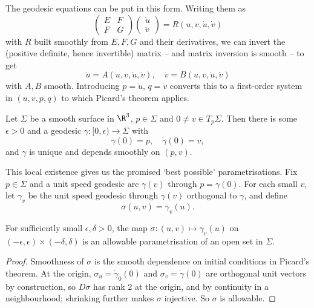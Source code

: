 The geodesic equations can be put in this form. Writing them as
$$
\begin{pmatrix} E & F \\ F & G \end{pmatrix}\begin{pmatrix} \ddot u \\ \ddot v \end{pmatrix} = R(u, v, \dot u, \dot v)
$$
with $R$ built smoothly from $E, F, G$ and their derivatives, we can invert the (positive definite, hence invertible) matrix -- and matrix inversion is smooth -- to get
$$
\ddot u = A(u, v, \dot u, \dot v), \quad \ddot v = B(u, v, \dot u, \dot v)
$$
with $A, B$ smooth. Introducing $p = \dot u$, $q = \dot v$ converts this to a first-order system in $(u, v, p, q)$ to which Picard's theorem applies.

\begin{corollary}\label{cor:geodesicexistence}
    Let $\Sigma$ be a smooth surface in $\R^3$, $p \in \Sigma$ and $0 \neq v \in T_p\Sigma$. Then there is some $\epsilon > 0$ and a geodesic $\gamma: [0, \epsilon) \rightarrow \Sigma$ with
    $$
    \gamma(0) = p, \quad \dot\gamma(0) = v,
    $$
    and $\gamma$ is unique and depends smoothly on $(p, v)$.
\end{corollary}

This local existence gives us the promised `best possible' parametrisations. Fix $p \in \Sigma$ and a unit speed geodesic arc $\gamma(v)$ through $p = \gamma(0)$. For each small $v$, let $\gamma_v$ be the unit speed geodesic through $\gamma(v)$ orthogonal to $\gamma$, and define
$$
\sigma(u, v) = \gamma_v(u).
$$

\begin{lemma}
    For sufficiently small $\epsilon, \delta > 0$, the map $\sigma: (u, v) \mapsto \gamma_v(u)$ on $(-\epsilon,\epsilon) \times (-\delta, \delta)$ is an allowable parametrisation of an open set in $\Sigma$.
\end{lemma}
\begin{proof}
    Smoothness of $\sigma$ is the smooth dependence on initial conditions in Picard's theorem. At the origin, $\sigma_u = \dot\gamma_0(0)$ and $\sigma_v = \dot\gamma(0)$ are orthogonal unit vectors by construction, so $D\sigma$ has rank 2 at the origin, and by continuity in a neighbourhood; shrinking further makes $\sigma$ injective. So $\sigma$ is allowable.
\end{proof}

